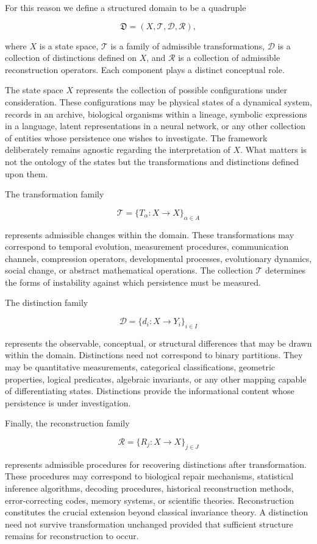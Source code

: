 \documentclass[12pt,oneside]{article}
\theoremstyle{definition}
\begin{document}
For this reason we define a structured domain to be a quadruple

\[
\mathfrak{D}
=
(X,\mathcal{T},\mathcal{D},\mathcal{R}),
\]

where \(X\) is a state space, \(\mathcal{T}\) is a family of admissible transformations, \(\mathcal{D}\) is a collection of distinctions defined on \(X\), and \(\mathcal{R}\) is a collection of admissible reconstruction operators. Each component plays a distinct conceptual role.

The state space \(X\) represents the collection of possible configurations under consideration. These configurations may be physical states of a dynamical system, records in an archive, biological organisms within a lineage, symbolic expressions in a language, latent representations in a neural network, or any other collection of entities whose persistence one wishes to investigate. The framework deliberately remains agnostic regarding the interpretation of \(X\). What matters is not the ontology of the states but the transformations and distinctions defined upon them.

The transformation family

\[
\mathcal{T}
=
\{T_\alpha:X\rightarrow X\}_{\alpha\in A}
\]

represents admissible changes within the domain. These transformations may correspond to temporal evolution, measurement procedures, communication channels, compression operators, developmental processes, evolutionary dynamics, social change, or abstract mathematical operations. The collection \(\mathcal{T}\) determines the forms of instability against which persistence must be measured.

The distinction family

\[
\mathcal{D}
=
\{d_i:X\rightarrow Y_i\}_{i\in I}
\]

represents the observable, conceptual, or structural differences that may be drawn within the domain. Distinctions need not correspond to binary partitions. They may be quantitative measurements, categorical classifications, geometric properties, logical predicates, algebraic invariants, or any other mapping capable of differentiating states. Distinctions provide the informational content whose persistence is under investigation.

Finally, the reconstruction family

\[
\mathcal{R}
=
\{R_j:X\rightarrow X\}_{j\in J}
\]

represents admissible procedures for recovering distinctions after transformation. These procedures may correspond to biological repair mechanisms, statistical inference algorithms, decoding procedures, historical reconstruction methods, error-correcting codes, memory systems, or scientific theories. Reconstruction constitutes the crucial extension beyond classical invariance theory. A distinction need not survive transformation unchanged provided that sufficient structure remains for reconstruction to occur.
\end{document}

